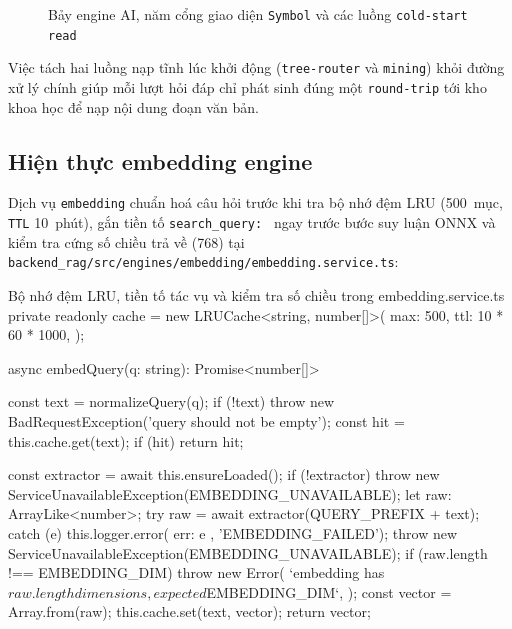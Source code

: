 \begin{figure}[htbp]
{%
}
\caption{Bảy engine AI, năm cổng giao diện \texttt{Symbol} và các luồng \texttt{cold-start read}}
\label{fig:bay-engine-ai-cong}
\end{figure}

Việc tách hai luồng nạp tĩnh lúc khởi động (\texttt{tree-router} và \texttt{mining}) khỏi đường xử lý chính giúp mỗi lượt hỏi đáp chỉ phát sinh đúng một \texttt{round-trip} tới kho khoa học để nạp nội dung đoạn văn bản.

\subsection{Hiện thực embedding engine}
\label{subsec:engine-nhung}

Dịch vụ \texttt{embedding} chuẩn hoá câu hỏi trước khi tra bộ nhớ đệm LRU (500~mục, \texttt{TTL} 10~phút), gắn tiền tố \texttt{search\_\allowbreak{}query: } ngay trước bước suy luận ONNX và kiểm tra cứng số chiều trả về (768) tại \texttt{backend\_\allowbreak{}rag/\allowbreak{}src/\allowbreak{}engines/\allowbreak{}embedding/\allowbreak{}embedding.\allowbreak{}service.\allowbreak{}ts}:

\begin{tsbox}{Bộ nhớ đệm LRU, tiền tố tác vụ và kiểm tra số chiều trong embedding.service.ts}
private readonly cache = new LRUCache<string, number[]>({
  max: 500,
  ttl: 10 * 60 * 1000,
});

async embedQuery(q: string): Promise<number[]> {
  const text = normalizeQuery(q);
  if (!text) throw new BadRequestException('query should not be empty');
  const hit = this.cache.get(text);
  if (hit) return hit;

  const extractor = await this.ensureLoaded();
  if (!extractor)
    throw new ServiceUnavailableException(EMBEDDING_UNAVAILABLE);
  let raw: ArrayLike<number>;
  try {
    raw = await extractor(QUERY_PREFIX + text);
  } catch (e) {
    this.logger.error({ err: e }, 'EMBEDDING_FAILED');
    throw new ServiceUnavailableException(EMBEDDING_UNAVAILABLE);
  }
  if (raw.length !== EMBEDDING_DIM) {
    throw new Error(
      `embedding has ${raw.length} dimensions, expected ${EMBEDDING_DIM}`,
    );
  }
  const vector = Array.from(raw);
  this.cache.set(text, vector);
  return vector;
}
\end{tsbox}

